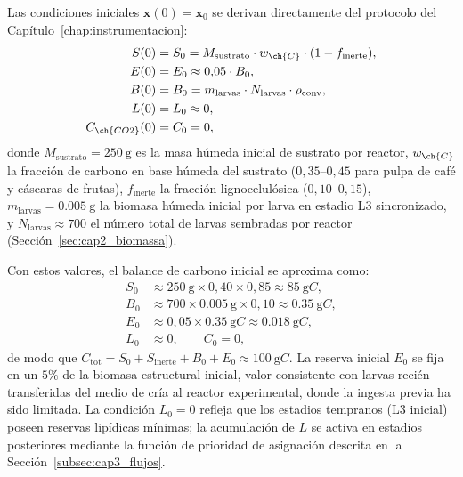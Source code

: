 Las condiciones iniciales $\mathbf{x}(0) = \mathbf{x}_0$ se derivan directamente del protocolo del Capítulo~\ref{chap:instrumentacion}:
\begin{align}
    S(0) &= S_0 = M_{\mathrm{sustrato}} \cdot w_{\ch{C}} \cdot (1 - f_{\mathrm{inerte}}), \label{eq:cap3_S0} \\
    E(0) &= E_0 \approx 0{,}05 \cdot B_0, \label{eq:cap3_E0} \\
    B(0) &= B_0 = m_{\mathrm{larvas}} \cdot N_{\mathrm{larvas}} \cdot \rho_{\mathrm{conv}}, \label{eq:cap3_B0} \\
    L(0) &= L_0 \approx 0, \label{eq:cap3_L0} \\
    C_{\ch{CO2}}(0) &= C_0 = 0, \label{eq:cap3_C0}
\end{align}
donde $M_{\mathrm{sustrato}} = \SI{250}{\gram}$ es la masa húmeda inicial de sustrato por reactor, $w_{\ch{C}}$ la fracción de carbono en base húmeda del sustrato ($0{,}35$--$0{,}45$ para pulpa de café y cáscaras de frutas), $f_{\mathrm{inerte}}$ la fracción lignocelulósica ($0{,}10$--$0{,}15$), $m_{\mathrm{larvas}} = \SI{0,005}{\gram}$ la biomasa húmeda inicial por larva en estadio L3 sincronizado, y $N_{\mathrm{larvas}} \approx 700$ el número total de larvas sembradas por reactor (Sección~\ref{sec:cap2_biomassa}).

Con estos valores, el balance de carbono inicial se aproxima como:
\begin{align*}
    S_0 &\approx \SI{250}{\gram} \times 0{,}40 \times 0{,}85 \approx \SI{85}{\gram C}, \\
    B_0 &\approx 700 \times \SI{0,005}{\gram} \times 0{,}10 \approx \SI{0,35}{\gram C}, \\
    E_0 &\approx 0{,}05 \times \SI{0,35}{\gram C} \approx \SI{0,018}{\gram C}, \\
    L_0 &\approx 0, \qquad C_0 = 0,
\end{align*}
de modo que $C_{\mathrm{tot}} = S_0 + S_{\mathrm{inerte}} + B_0 + E_0 \approx \SI{100}{\gram C}$. La reserva inicial $E_0$ se fija en un $5\%$ de la biomasa estructural inicial, valor consistente con larvas recién transferidas del medio de cría al reactor experimental, donde la ingesta previa ha sido limitada. La condición $L_0 = 0$ refleja que los estadios tempranos (L3 inicial) poseen reservas lipídicas mínimas; la acumulación de $L$ se activa en estadios posteriores mediante la función de prioridad de asignación descrita en la Sección~\ref{subsec:cap3_flujos}.

